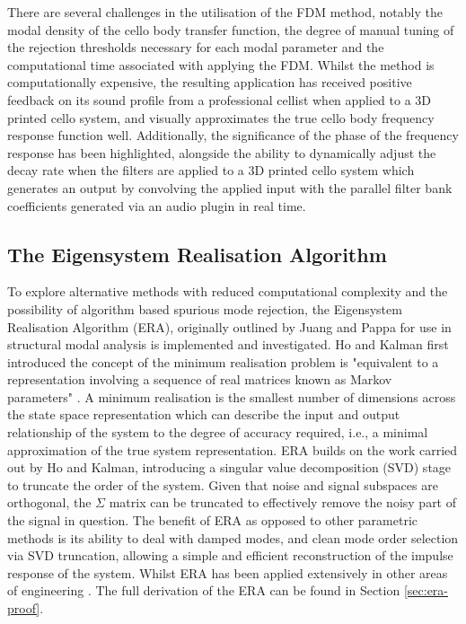 There are several challenges in the utilisation of the FDM method, notably the modal density of the cello body transfer function, the degree of manual tuning of the rejection thresholds necessary for each modal parameter and the computational time associated with applying the FDM. Whilst the method is computationally expensive, the resulting application has received positive feedback on its sound profile from a professional cellist when applied to a 3D printed cello system, and visually approximates the true cello body frequency response function well. Additionally, the significance of the phase of the frequency response has been highlighted, alongside the ability to dynamically adjust the decay rate when the filters are applied to a 3D printed cello system which generates an output by convolving the applied input with the parallel filter bank coefficients generated via an audio plugin in real time.

\subsection{The Eigensystem Realisation Algorithm}
To explore alternative methods with reduced computational complexity and the possibility of algorithm based spurious mode rejection, the Eigensystem Realisation Algorithm (ERA), originally outlined by Juang and Pappa \cite{era,era-space} for use in structural modal analysis is implemented and investigated.
Ho and Kalman first introduced the concept of the minimum realisation problem is "equivalent to a representation involving a sequence of real matrices known as Markov parameters" \cite{era}. A minimum realisation is the smallest number of dimensions across the state space representation which can describe the input and output relationship of the system to the degree of accuracy required, i.e., a minimal approximation of the true system representation. ERA builds on the work carried out by Ho and Kalman, introducing a singular value decomposition (SVD) stage to truncate the order of the system. Given that noise and signal subspaces are orthogonal, the $\Sigma$ matrix can be truncated to effectively remove the noisy part of the signal in question. The benefit of ERA as opposed to other parametric methods is its ability to deal with damped modes, and clean mode order selection via SVD truncation, allowing a simple and efficient reconstruction of the impulse response of the system.
Whilst ERA has been applied extensively in other areas of engineering \cite{pappa1998,lin2021,zhang2016,chiang2010}. The full derivation of the ERA can be found in Section \ref{sec:era-proof}.

